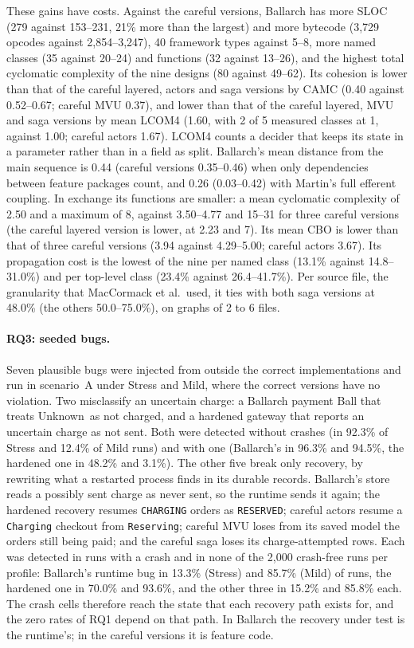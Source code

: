 \documentclass[11pt]{article}
\theoremstyle{definition}
\theoremstyle{plain}
\newcommand{\Unknown}{\textsf{Unknown}}
\begin{document}
These gains have costs. Against the careful versions, Ballarch has more SLOC (279 against 153--231, 21\% more than the largest) and more bytecode (3{,}729 opcodes against 2{,}854--3{,}247), 40 framework types against 5--8, more named classes (35 against 20--24) and functions (32 against 13--26), and the highest total cyclomatic complexity of the nine designs (80 against 49--62). Its cohesion is lower than that of the careful layered, actors and saga versions by CAMC (0.40 against 0.52--0.67; careful MVU 0.37), and lower than that of the careful layered, MVU and saga versions by mean LCOM4 (1.60, with 2 of 5 measured classes at 1, against 1.00; careful actors 1.67). LCOM4 counts a decider that keeps its state in a parameter rather than in a field as split. Ballarch's mean distance from the main sequence is 0.44 (careful versions 0.35--0.46) when only dependencies between feature packages count, and 0.26 (0.03--0.42) with Martin's full efferent coupling. In exchange its functions are smaller: a mean cyclomatic complexity of 2.50 and a maximum of 8, against 3.50--4.77 and 15--31 for three careful versions (the careful layered version is lower, at 2.23 and 7). Its mean CBO is lower than that of three careful versions (3.94 against 4.29--5.00; careful actors 3.67). Its propagation cost is the lowest of the nine per named class (13.1\% against 14.8--31.0\%) and per top-level class (23.4\% against 26.4--41.7\%). Per source file, the granularity that MacCormack et al.\ used, it ties with both saga versions at 48.0\% (the others 50.0--75.0\%), on graphs of 2 to 6 files.

\paragraph{RQ3: seeded bugs.} Seven plausible bugs were injected from outside the correct implementations and run in scenario~A under Stress and Mild, where the correct versions have no violation. Two misclassify an uncertain charge: a Ballarch payment Ball that treats \Unknown\ as not charged, and a hardened gateway that reports an uncertain charge as not sent. Both were detected without crashes (in 92.3\% of Stress and 12.4\% of Mild runs) and with one (Ballarch's in 96.3\% and 94.5\%, the hardened one in 48.2\% and 3.1\%). The other five break only recovery, by rewriting what a restarted process finds in its durable records. Ballarch's store reads a possibly sent charge as never sent, so the runtime sends it again; the hardened recovery resumes \texttt{CHARGING} orders as \texttt{RESERVED}; careful actors resume a \texttt{Charging} checkout from \texttt{Reserving}; careful MVU loses from its saved model the orders still being paid; and the careful saga loses its charge-attempted rows. Each was detected in runs with a crash and in none of the 2{,}000 crash-free runs per profile: Ballarch's runtime bug in 13.3\% (Stress) and 85.7\% (Mild) of runs, the hardened one in 70.0\% and 93.6\%, and the other three in 15.2\% and 85.8\% each. The crash cells therefore reach the state that each recovery path exists for, and the zero rates of RQ1 depend on that path. In Ballarch the recovery under test is the runtime's; in the careful versions it is feature code.
\end{document}
